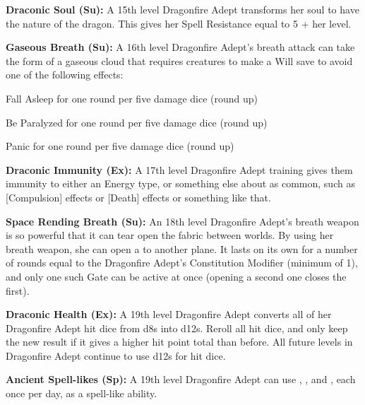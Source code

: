 \textbf{Draconic Soul (Su):} A 15th level Dragonfire Adept transforms her soul to have the nature of the dragon. This gives her Spell Resistance equal to 5 + her level.

\textbf{Gaseous Breath (Su):} A 16th level Dragonfire Adept's breath attack can take the form of a gaseous cloud that requires creatures to make a Will save to avoid one of the following effects:

\begin{itemize*}
\item Fall Asleep for one round per five damage dice (round up)
\item Be Paralyzed for one round per five damage dice (round up)
\item Panic for one round per five damage dice (round up)
\end{itemize*}

\textbf{Draconic Immunity (Ex):} A 17th level Dragonfire Adept training gives them immunity to either an Energy type, or something else about as common, such as [Compulsion] effects or [Death] effects or something like that.

\textbf{Space Rending Breath (Su):} An 18th level Dragonfire Adept's breath weapon is so powerful that it can tear open the fabric between worlds. By using her breath weapon, she can open a  to another plane. It lasts on its own for a number of rounds equal to the Dragonfire Adept's Constitution Modifier (minimum of 1), and only one such Gate can be active at once (opening a second one closes the first).

\textbf{Draconic Health (Ex):} A 19th level Dragonfire Adept converts all of her Dragonfire Adept hit dice from d8s into d12s. Reroll all hit dice, and only keep the new result if it gives a higher hit point total than before. All future levels in Dragonfire Adept continue to use d12s for hit dice.

\textbf{Ancient Spell-likes (Sp):} A 19th level Dragonfire Adept can use , , and , each once per day, as a spell-like ability.
